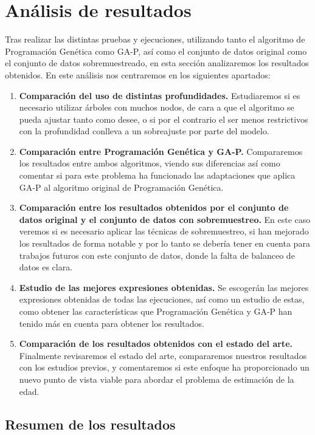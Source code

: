 
\section{Análisis de resultados}

Tras realizar las distintas pruebas y ejecuciones, utilizando tanto el algoritmo de Programación Genética como GA-P, así como el conjunto de datos original como el conjunto de datos sobremuestreado, en esta sección analizaremos los resultados obtenidos. En este análisis nos centraremos en los siguientes apartados:

\begin{enumerate}
	\item \textbf{Comparación del uso de distintas profundidades.} Estudiaremos si es necesario utilizar árboles con muchos nodos, de cara a que el algoritmo se pueda ajustar tanto como desee, o si por el contrario el ser menos restrictivos con la profundidad conlleva a un sobreajuste por parte del modelo.
	\item \textbf{Comparación entre Programación Genética y GA-P.} Compararemos los resultados entre ambos algoritmos, viendo sus diferencias así como comentar si para este problema ha funcionado las adaptaciones que aplica GA-P al algoritmo original de Programación Genética.
	\item \textbf{Comparación entre los resultados obtenidos por el conjunto de datos original y el conjunto de datos con sobremuestreo.} En este caso veremos si es necesario aplicar las técnicas de sobremuestreo, si han mejorado los resultados de forma notable y por lo tanto se debería tener en cuenta para trabajos futuros con este conjunto de datos, donde la falta de balanceo de datos es clara.
	\item \textbf{Estudio de las mejores expresiones obtenidas.} Se escogerán las mejores expresiones obtenidas de todas las ejecuciones, así como un estudio de estas, como obtener las características que Programación Genética y GA-P han tenido más en cuenta para obtener los resultados.
	\item \textbf{Comparación de los resultados obtenidos con el estado del arte.} Finalmente revisaremos el estado del arte, compararemos nuestros resultados con los estudios previos, y comentaremos si este enfoque ha proporcionado un nuevo punto de vista viable para abordar el problema de estimación de la edad.
\end{enumerate}


\subsection{Resumen de los resultados}

